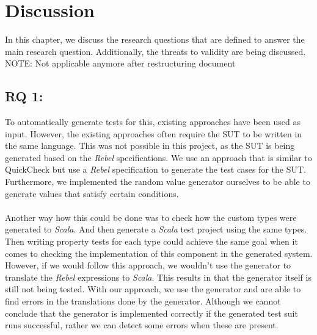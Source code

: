 \chapter{Discussion}
\label{cpt:7_discussion}
In this chapter, we discuss the research questions that are defined to answer the main research question. Additionally, the threats to validity are being discussed.\\
NOTE: Not applicable anymore after restructuring document
\section{RQ 1: \rqOne}
To automatically generate tests for this, existing approaches have been used as input. However, the existing approaches often require the SUT to be written in the same language. This was not possible in this project, as the SUT is being generated based on the \textit{Rebel} specifications. We use an approach that is similar to QuickCheck but use a \textit{Rebel} specification to generate the test cases for the SUT. Furthermore, we implemented the random value generator ourselves to be able to generate values that satisfy certain conditions.\\
\\
Another way how this could be done was to check how the custom types were generated to \textit{Scala}. And then generate a \textit{Scala} test project using the same types. Then writing property tests for each type could achieve the same goal when it comes to checking the implementation of this component in the generated system. However, if we would follow this approach, we wouldn't use the generator to translate the \textit{Rebel} expressions to \textit{Scala}. This results in that the generator itself is still not being tested. With our approach, we use the generator and are able to find errors in the translations done by the generator. Although we cannot conclude that the generator is implemented correctly if the generated test suit runs successful, rather we can detect some errors when these are present.

